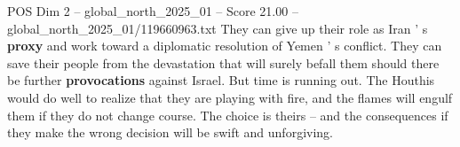 \begin{textsample}{POS Dim 2 – global\_north\_2025\_01 – Score 21.00 – global\_north\_2025\_01/119660963.txt}
They can give up their role as Iran ' s \textbf{proxy} and work toward a diplomatic resolution of Yemen ' s conflict.
They can save their people from the devastation that will surely befall them should there be further \textbf{provocations} against Israel.
But time is running out.
The Houthis would do well to realize that they are playing with fire, and the flames will engulf them if they do not change course.
The choice is theirs -- and the consequences if they make the wrong decision will be swift and unforgiving.

\end{textsample}

